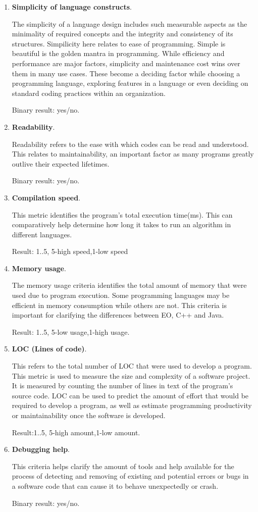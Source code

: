 \documentclass[12pt]{book}
\begin{document}
\begin{enumerate}
    \item \textbf{Simplicity of language constructs}.
    
The simplicity of a language design includes such measurable aspects as the minimality of required concepts and the integrity and consistency of its structures. Simpilicity here relates to ease of programming. Simple is beautiful is the golden mantra in programming. While efficiency and performance are major factors, simplicity and maintenance cost wins over them in many use cases. These become a deciding factor while choosing a programming language, exploring features in a language or even deciding on standard coding practices within an organization.

Binary result: yes/no.
    \item \textbf{Readability}.
    
Readability refers to the ease with which codes can be read and understood. This relates to maintainability, an important factor as many programs greatly outlive their expected lifetimes.

Binary result: yes/no.
    \item \textbf{Compilation speed}.
    
This metric identifies the program's total execution time(ms). This can comparatively help determine how long it takes to run an algorithm in different languages.

Result: 1..5, 5-high speed,1-low speed
    \item \textbf{Memory usage}.
    
The memory usage criteria identifies the  total amount of memory that were used due to program execution. Some programming languages may be efficient in memory consumption while others are not. This criteria is important for clarifying the differences between EO, C++ and Java.

Result: 1..5, 5-low usage,1-high usage.
    \item \textbf{LOC (Lines of code)}.
    
This refers to the total number of LOC that were used to develop a program. This metric is used to measure the size and complexity of a software project. It is measured by counting the number of lines in text of the program's source code. LOC can be used to predict the amount of effort that would be required to develop a program, as well as estimate programming productivity or maintainability once the software is developed.

Result:1..5, 5-high amount,1-low amount.
    \item \textbf{Debugging help}.
    
This criteria helps clarify the amount of tools and help available for the process of detecting and removing of existing and potential errors or bugs in a software code that can cause it to behave unexpectedly or crash.

Binary result: yes/no.
\end{enumerate}
\end{document}

